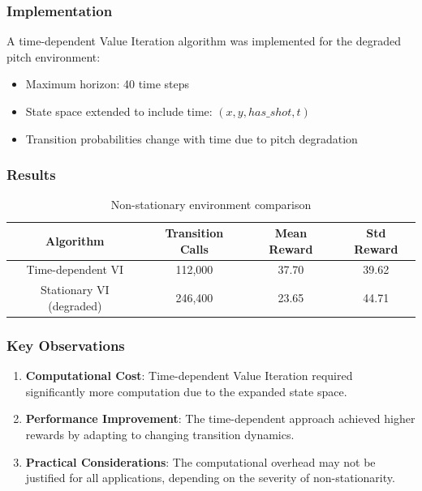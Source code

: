 \documentclass[12pt]{article}
\begin{document}
\subsubsection{Implementation}

A time-dependent Value Iteration algorithm was implemented for the degraded pitch environment:
\begin{itemize}
    \item Maximum horizon: 40 time steps
    \item State space extended to include time: $(x, y, has\_shot, t)$
    \item Transition probabilities change with time due to pitch degradation
\end{itemize}

\subsubsection{Results}

\begin{table}[H]
\centering
\begin{tabular}{|c|c|c|c|}
\hline
Algorithm & Transition Calls & Mean Reward & Std Reward \\
\hline
Time-dependent VI & 112,000 & 37.70 & 39.62 \\
Stationary VI (degraded) & 246,400 & 23.65 & 44.71 \\
\hline
\end{tabular}
\caption{Non-stationary environment comparison}
\end{table}

\subsubsection{Key Observations}

\begin{enumerate}
    \item \textbf{Computational Cost}: Time-dependent Value Iteration required significantly more computation due to the expanded state space.
    
    \item \textbf{Performance Improvement}: The time-dependent approach achieved higher rewards by adapting to changing transition dynamics.
    
    \item \textbf{Practical Considerations}: The computational overhead may not be justified for all applications, depending on the severity of non-stationarity.
\end{enumerate}
\end{document}
